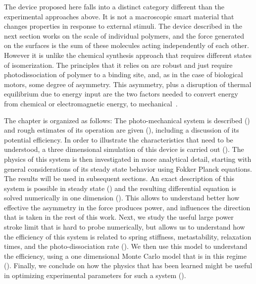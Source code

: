 \documentclass[11pt]{ucthesis}
\begin{document}
The device proposed here falls into a distinct category different than the
experimental approaches above. It is not a macroscopic smart
material that changes properties in response to external stimuli. The device
described in the next section works on the scale of individual polymers, 
and the force generated on the surfaces is the sum of these molecules
acting independently of each other. However it is unlike the chemical synthesis
approach that requires different states of isomerization. The principles
that it relies on are robust and just require
photodissociation of polymer to a binding site, and, as in the case of biological
motors, some degree of asymmetry.
This asymmetry, plus a disruption of thermal equilibrium due to energy input
are the two factors needed to convert energy from chemical or electromagnetic energy, to
mechanical~\cite{ProstPRL}.

The chapter is organized as follows: The photo-mechanical system is described () and rough estimates of its
operation are given (), including a discussion
of its potential efficiency. In order to illustrate the characteristics
that need to be understood, a three dimensional simulation of this device
is carried out (). The physics of this system is then
investigated in more analytical detail, starting with general considerations of its steady state behavior using Fokker Planck equations. The results will be used in subsequent sections. An exact description of this
system is possible in steady state () and the resulting differential equation
is solved numerically in one dimension (). This allows
to understand better how effective the asymmetry in the force produces power,
and influences the direction that is taken in the rest of this work. Next, we study the useful large power stroke limit that is hard to probe
numerically, but allows us to understand how the efficiency of this system is
related to spring stiffness, metastability, relaxation times, and the
photo-dissociation rate (). We then use this model to understand the efficiency,
using a one dimensional Monte Carlo model that is in this regime (). Finally, we conclude on how the physics that has been learned 
might be useful in optimizing experimental parameters for such a system ().
\end{document}
